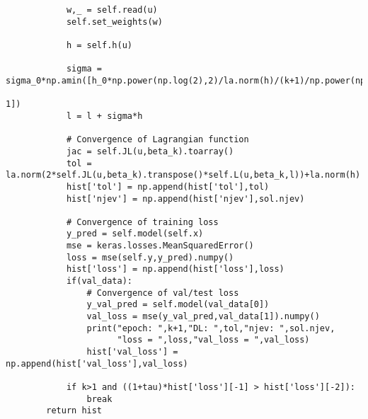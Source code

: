 \begin{verbatim}
            w,_ = self.read(u)
            self.set_weights(w)

            h = self.h(u)

            sigma = sigma_0*np.amin([h_0*np.power(np.log(2),2)/la.norm(h)/(k+1)/np.power(np.log(k+2),2),
            																						 1])
            l = l + sigma*h

            # Convergence of Lagrangian function
            jac = self.JL(u,beta_k).toarray()
            tol = la.norm(2*self.JL(u,beta_k).transpose()*self.L(u,beta_k,l))+la.norm(h)
            hist['tol'] = np.append(hist['tol'],tol)
            hist['njev'] = np.append(hist['njev'],sol.njev)

            # Convergence of training loss
            y_pred = self.model(self.x)
            mse = keras.losses.MeanSquaredError()
            loss = mse(self.y,y_pred).numpy()
            hist['loss'] = np.append(hist['loss'],loss)
            if(val_data):
                # Convergence of val/test loss
                y_val_pred = self.model(val_data[0])
                val_loss = mse(y_val_pred,val_data[1]).numpy()
                print("epoch: ",k+1,"DL: ",tol,"njev: ",sol.njev, 
                	  "loss = ",loss,"val_loss = ",val_loss)
                hist['val_loss'] = np.append(hist['val_loss'],val_loss)

            if k>1 and ((1+tau)*hist['loss'][-1] > hist['loss'][-2]):
                break
        return hist

\end{verbatim}

